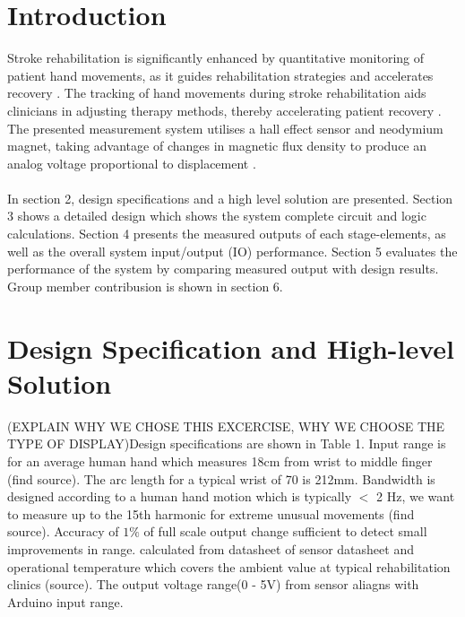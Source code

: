 \documentclass[a4paper,12pt]{article}
\begin{document}
\section{Introduction}
Stroke rehabilitation is significantly enhanced by quantitative monitoring of patient hand movements, as it guides rehabilitation strategies and accelerates recovery \cite{langhorne2011stroke}. The tracking of hand movements during stroke rehabilitation aids clinicians in adjusting therapy methods, thereby accelerating patient recovery \cite{veerbeek2014effects}. The presented measurement system utilises a hall effect sensor and neodymium magnet, taking advantage of changes in magnetic flux density to produce an analog voltage proportional to displacement \cite{popovic2013hall}.\\ \\
\noindent
In section 2, design specifications and a high level solution are presented. Section 3 shows a detailed design which shows the system complete circuit and logic calculations. Section 4 presents the measured outputs of each stage-elements, as well as the overall system input/output (IO) performance. Section 5 evaluates the performance of the system by comparing measured output with design results. Group member contribusion is shown in section 6.


%
\section{Design Specification and High-level Solution}
(EXPLAIN WHY WE CHOSE THIS EXCERCISE, WHY WE CHOOSE THE TYPE OF DISPLAY)Design specifications are shown in Table 1. Input range is for an average human hand which measures 18cm from wrist to middle finger (find source). The arc length for a typical wrist of 70\textdegree{} is 212mm. Bandwidth is designed according to a human hand motion which is typically $<$ 2 Hz, we want to measure up to the 15th harmonic for extreme unusual movements (find source). Accuracy of $1\%$ of full scale output change sufficient to detect small improvements in range. calculated from datasheet of sensor datasheet and operational temperature which covers the ambient value at typical rehabilitation clinics (source). The output voltage range(0 - 5V) from sensor aliagns with Arduino input range.
\end{document}
